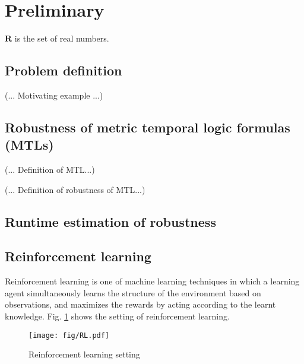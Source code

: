 \section{Preliminary}\label{sec:preliminary}

$\mathbf R$ is the set of real numbers.

\subsection{Problem definition}

(... Motivating example ...)

\subsection{Robustness of metric temporal logic formulas (MTLs)}

(... Definition of MTL...)

(... Definition of robustness of MTL...)

\subsection{Runtime estimation of robustness}

\subsection{Reinforcement learning}

Reinforcement learning is one of machine learning techniques in which a learning agent simultaneously learns the structure of the environment based on observations, and maximizes the rewards by acting according to the learnt knowledge.
Fig. \ref{fig:RL} shows the setting of reinforcement learning.

\begin{figure}
  \centering
  \small
  \texttt{[image: fig/RL.pdf]}
  \caption{Reinforcement learning setting}
  \label{fig:RL}
\end{figure}

